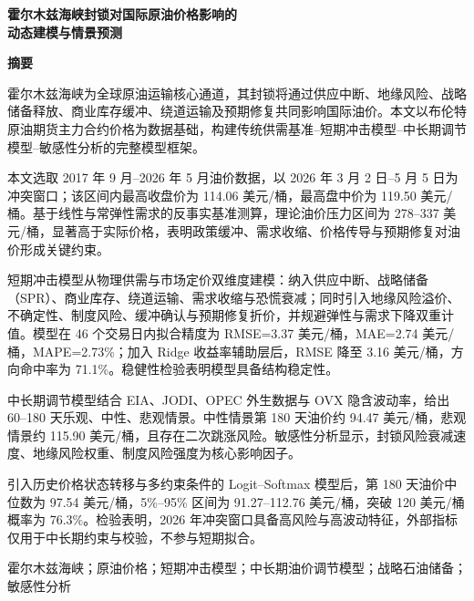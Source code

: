 \thispagestyle{plain}
\normalfont
\enlargethispage{2\baselineskip}

\begin{center}
\vspace*{0.15cm}
{\sffamily\bfseries{}霍尔木兹海峡封锁对国际原油价格影响的\\[0.25em]动态建模与情景预测\par}
\vspace{1.1em}
{\sffamily\bfseries{} 摘\quad 要}
\end{center}

\vspace{-0.2em}
霍尔木兹海峡为全球原油运输核心通道，其封锁将通过供应中断、地缘风险、战略储备释放、商业库存缓冲、绕道运输及预期修复共同影响国际油价。本文以布伦特原油期货主力合约价格为数据基础，构建传统供需基准--短期冲击模型--中长期调节模型--敏感性分析的完整模型框架。

本文选取 2017 年 9 月--2026 年 5 月油价数据，以 2026 年 3 月 2 日--5 月 5 日为冲突窗口；该区间内最高收盘价为 114.06 美元/桶，最高盘中价为 119.50 美元/桶。基于线性与常弹性需求的反事实基准测算，理论油价压力区间为 278--337 美元/桶，显著高于实际价格，表明政策缓冲、需求收缩、价格传导与预期修复对油价形成关键约束。

短期冲击模型从物理供需与市场定价双维度建模：纳入供应中断、战略储备（SPR）、商业库存、绕道运输、需求收缩与恐慌衰减；同时引入地缘风险溢价、不确定性、制度风险、缓冲确认与预期修复折价，并规避弹性与需求下降双重计值。模型在 46 个交易日内拟合精度为 RMSE=3.37 美元/桶，MAE=2.74 美元/桶，MAPE=2.73\%；加入 Ridge 收益率辅助层后，RMSE 降至 3.16 美元/桶，方向命中率为 71.1\%。稳健性检验表明模型具备结构稳定性。

中长期调节模型结合 EIA、JODI、OPEC 外生数据与 OVX 隐含波动率，给出 60--180 天乐观、中性、悲观情景。中性情景第 180 天油价约 94.47 美元/桶，悲观情景约 115.90 美元/桶，且存在二次跳涨风险。敏感性分析显示，封锁风险衰减速度、地缘风险权重、制度风险强度为核心影响因子。

引入历史价格状态转移与多约束条件的 Logit--Softmax 模型后，第 180 天油价中位数为 97.54 美元/桶，5\%--95\% 区间为 91.27--112.76 美元/桶，突破 120 美元/桶概率为 76.3\%。检验表明，2026 年冲突窗口具备高风险与高波动特征，外部指标仅用于中长期约束与校验，不参与短期拟合。

\vspace{0.35em}
 霍尔木兹海峡；原油价格；短期冲击模型；中长期油价调节模型；战略石油储备；敏感性分析
\normalfont\normalsize
